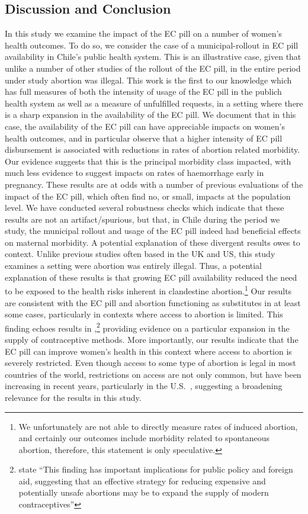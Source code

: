 \documentclass[12pt]{article}
\begin{document}
\begin{spacing}{1.9}
  \section{Discussion and Conclusion}
  \label{scn:disc}
  In this study we examine the impact of the EC pill on a number of women's health outcomes.  To do so, we consider the case of a municipal-rollout in EC pill availability in Chile's public health system.  This is an illustrative case, given that unlike a number of other studies of the rollout of the EC pill, in the entire period under study abortion was illegal. This work is the first to our knowledge which has full measures of both the intensity of usage of the EC pill in the publich health system as well as a measure of unfulfilled requests, in a setting where there is a sharp expansion in the availability of the EC pill.  We document that in this case, the availability of the EC pill can have appreciable impacts on women's health outcomes, and in particular observe that a higher intensity of EC pill disbursement is associated with reductions in rates of abortion related morbidity.  Our evidence suggests that this is the principal morbidity class impacted, with much less evidence to suggest impacts on rates of haemorrhage early in pregnancy. 
  These results are at odds with a number of previous evaluations of the impact of the EC pill, which often find no, or small, impacts at the population level. We have conducted several robustness checks which indicate that these results are not an artifact/spurious, but that, in Chile during the period we study, the municipal rollout and usage of the EC pill indeed had beneficial effects on maternal morbidity. A potential explanation of these divergent results owes to context.  Unlike previous studies often based in the UK and US, this study examines a setting were abortion was entirely illegal.  Thus, a potential explanation of these results is that growing EC pill availability reduced the need to be exposed to the health risks inherent in clandestine abortion.\footnote{We unfortunately are not able to directly measure  rates of induced abortion, and certainly our outcomes include morbidity related to spontaneous abortion, therefore, this statement is only speculative.}
  Our results are consistent with the EC pill and abortion functioning as substitutes in at least some cases, particularly in contexts where access to abortion is limited.  This finding echoes results in \citet{MillerValente2016},\footnote{\citet[p.\ 979]{MillerValente2016} state ``This finding has important implications for public policy and foreign aid, suggesting that an effective strategy for reducing expensive and potentially unsafe abortions may be to expand the supply of modern contraceptives''} providing evidence on a particular expansion in the supply of contraceptive methods.
More importantly, our results indicate that the EC pill can improve women's health in this context where access to abortion is severely restricted. Even though access to some type of abortion is legal in most countries of the world, restrictions on access are not only common, but have been increasing in recent years, particularly in the U.S.\ \citep{Stotland2018}, suggesting a broadening relevance for the results in this study. 


\end{spacing}
\end{document}
